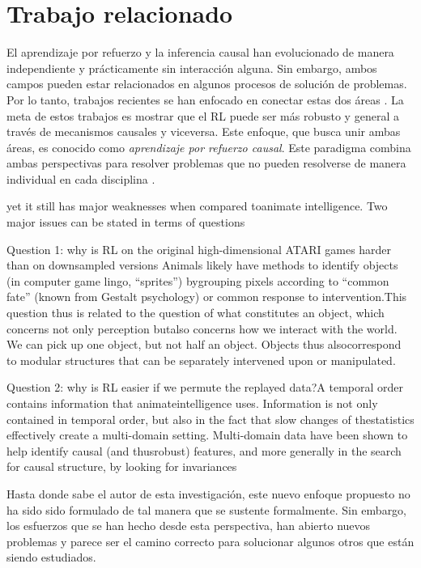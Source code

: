 \chapter{Trabajo relacionado}\label{chapter3}

\graphicspath{{Chapter3/Figs/}}


El aprendizaje por refuerzo y la inferencia
causal han evolucionado de manera 
independiente y prácticamente sin 
interacción alguna. Sin embargo, ambos campos
pueden estar relacionados en algunos
procesos de solución de problemas.
Por lo tanto, trabajos recientes
se han enfocado en conectar estas dos
áreas \cite{Gershman2017, 6-DBLP:journals/midm/YuDLR19, lu2018deconfounding, dasgupta2019causal}. La meta de estos trabajos es mostrar que el RL puede ser más robusto y general a través de mecanismos
causales y viceversa.
Este enfoque, que busca unir ambas áreas, es conocido como
\textit{aprendizaje por refuerzo causal}. Este paradigma combina
ambas perspectivas para resolver problemas que no pueden
resolverse de manera individual en cada disciplina \cite{CausalRL2019EliasB, chaochao_2019}.

 yet it still has major weaknesses when compared toanimate intelligence. Two major issues can be stated in terms of questions
 
 Question 1: why is RL on the original high-dimensional ATARI games harder than on downsampled versions
  Animals likely have methods to identify objects (in computer game lingo, “sprites”) bygrouping pixels according to “common fate” (known from Gestalt psychology) or common response to intervention.This question thus is related to the question of what constitutes an object, which concerns not only perception butalso concerns how we interact with the world. We can pick up one object, but not half an object. Objects thus alsocorrespond to modular structures that can be separately intervened upon or manipulated. 
 
 Question 2: why is RL easier if we permute the replayed data?A
 temporal order contains information that animateintelligence uses.  Information is not only contained in temporal order, but also in the fact that slow changes of thestatistics effectively create a multi-domain setting. Multi-domain data have been shown to help identify causal (and thusrobust) features, and more generally in the search for causal structure, by looking for invariances 
 
Hasta donde sabe el autor de esta investigación, este nuevo enfoque propuesto no ha sido sido formulado de tal manera que se sustente formalmente.
Sin embargo, los esfuerzos que se han hecho desde esta perspectiva, han abierto
nuevos problemas y parece ser el camino correcto para solucionar algunos otros
que están siendo estudiados.


